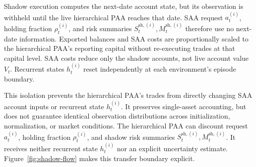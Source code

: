 Shadow execution computes the next-date account state, but its observation is withheld until the live hierarchical PAA reaches that date. SAA request \(a_t^{(i)}\), holding fraction \(\rho_t^{(i)}\), and risk summaries \(S_t^{\mathrm{sh},(i)},M_t^{\mathrm{sh},(i)}\) therefore use no next-date information. Exported balances and SAA costs are proportionally scaled to the hierarchical PAA's reporting capital without re-executing trades at that capital level. SAA costs reduce only the shadow accounts, not live account value \(V_t\). Recurrent states \(h_t^{(i)}\) reset independently at each environment's episode boundary.

This isolation prevents the hierarchical PAA's trades from directly changing SAA account inputs or recurrent state \(h_t^{(i)}\). It preserves single-asset accounting, but does not guarantee identical observation distributions across initialization, normalization, or market conditions. The hierarchical PAA can discount request \(a_t^{(i)}\), holding fraction \(\rho_t^{(i)}\), and shadow risk summaries \(S_t^{\mathrm{sh},(i)},M_t^{\mathrm{sh},(i)}\). It receives neither recurrent state \(h_t^{(i)}\) nor an explicit uncertainty estimate. Figure~\ref{fig:shadow-flow} makes this transfer boundary explicit.


